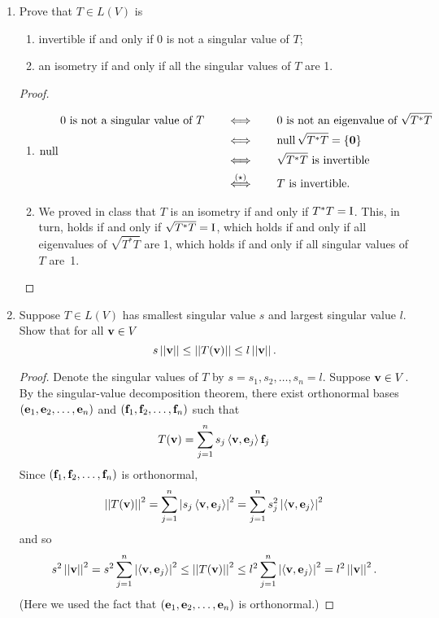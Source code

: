\documentclass[11pt]{amsart}
\begin{document}
\begin{enumerate}[(1)]
\item Prove that $T \in L(V)$ is 
  \begin{enumerate}
  \item invertible if and only if 0 is not a singular value of $T$;
  \item an isometry if and only if all the singular values of $T$ are 1.
  \end{enumerate}

\begin{proof}
\begin{enumerate}

\item 
\begin{align*}
  0 \text{ is not a singular value of } T
  &\qquad \Longleftrightarrow \qquad
  0 \text{ is not an eigenvalue of } \sqrt{ T^* T } \\
  &\qquad \Longleftrightarrow \qquad
  \null \sqrt{ T^* T } = \{ \0 \} \\
  &\qquad \Longleftrightarrow \qquad
  \sqrt{ T^* T } \text{ is invertible } \\
  &\qquad \stackrel{ (\star) }{ \Longleftrightarrow } \qquad
  T \text{ is invertible. }
\end{align*}

\item We proved in class that $T$ is an isometry if and only if $T^* T = \mathrm I$. This, in turn, holds if and only if $\sqrt{ T^* T } = \mathrm I$, which holds if and only if all eigenvalues of $\sqrt{ T^* T }$ are 1, which holds if and only if all singular values of $T$ are~1. \qedhere

\end{enumerate}
\end{proof}

\item Suppose $T \in L(V)$ has smallest singular value $s$ and largest singular value $l$. Show that for all $\mathbf v \in V$
\[
  s \left|\left| \mathbf v \right|\right| \le \left|\left|  T(\mathbf v)  \right|\right| \le l \left|\left| \mathbf v \right|\right| .
\]

\begin{proof}
Denote the singular values of $T$ by $s = s_1, s_2, \dots, s_n = l$.
Suppose $\mathbf v \in V$.
By the singular-value decomposition theorem, there exist orthonormal bases $\left( \mathbf e_1, \mathbf e_2, \dots, \mathbf e_n \right)$ and $\left( \mathbf f_1, \mathbf f_2, \dots, \mathbf f_n \right)$ such that
\[
  T(\mathbf v) = \sum_{ j=1 }^n s_j \left< \mathbf v, \mathbf e_j  \right> \mathbf f_j
\]
Since $\left( \mathbf f_1, \mathbf f_2, \dots, \mathbf f_n \right)$ is orthonormal,
\[
  \left|\left|  T(\mathbf v)  \right|\right|^2 = \sum_{ j=1 }^n \left| s_j \left< \mathbf v, \mathbf e_j  \right> \right|^2 = \sum_{ j=1 }^n s_j^2 \left| \left< \mathbf v, \mathbf e_j  \right> \right|^2
\]
and so
\[
  s^2 \left|\left| \mathbf v \right|\right|^2 = s^2  \sum_{ j=1 }^n \left| \left< \mathbf v, \mathbf e_j  \right> \right|^2 \le \left|\left|  T(\mathbf v)  \right|\right|^2 \le l^2 \sum_{ j=1 }^n \left| \left< \mathbf v, \mathbf e_j  \right> \right|^2 = l^2 \left|\left| \mathbf v \right|\right|^2 .
\]
(Here we used the fact that $\left( \mathbf e_1, \mathbf e_2, \dots, \mathbf e_n \right)$ is orthonormal.)
\end{proof}

\end{enumerate}
\end{document}
